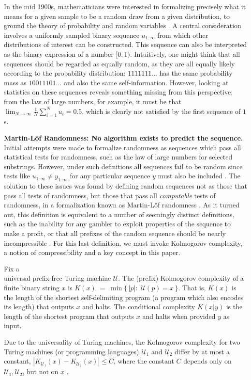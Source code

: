 \documentclass[twoside]{article}
\begin{document}
%
In the mid 1900s, mathematicians were interested in formalizing precisely what it means for a given sample to be a random draw from a given distribution, to ground the theory of probability and random variables \citep{shafer2006sources}. A central consideration involves a uniformly sampled binary sequence $u_{1:\infty}$ from which other distributions of interest can be constructed. This sequence can also be interpreted as the binary expression of a number $[0,1)$. Intuitively, one might think that all sequences should be regarded as equally random, as they are all equally likely according to the probability distribution: $1111111\dots$ has the same probability mass as $10011101\dots$ and also the same self-information. However, looking at statistics on these sequences reveals something missing from this perspective; from the law of large numbers, for example, it must be that $\lim_{N\to \infty}\frac{1}{N}\sum_{i=1}^Nu_i=0.5$, which is clearly not satisfied by the first sequence of $1$s.

\textbf{Martin-L\"of Randomness: No algorithm exists to predict the sequence.}
Initial attempts were made to formalize randomness as sequences which pass all statistical tests for randomness, such as the law of large numbers for selected substrings. However, under such definitions all sequences fail to be random since tests like $u_{1:\infty}\ne y_{1:\infty}$ for any particular sequence $y$ must also be included \citep{downey2019algorithmic}. The solution to these issues was found by defining random sequences not as those that pass all tests of randomness, but those that pass all \emph{computable} tests of randomness, in a formalization known as Martin-L\"of randomness \citep{martin1966definition}. As it turned out, this definition is equivalent to a number of seemingly distinct definitions, such as the inability for any gambler to exploit properties of the sequence to make a profit, or that all prefixes of the random sequence should be nearly incompressible \citep{terwijn2016mathematical}. 
For this last definition, we must invoke Kolmogorov complexity, a notion of compressibility and a key concept in this paper.

\begin{definition}
Fix a \\ universal prefix-free Turing machine $\mathcal{U}$. The (prefix) Kolmogorov complexity of a finite binary string $x$ is $K(x)\;=\;\min\{\,|p|:\; \mathcal{U}(p)=x\,\}$.
That is, $K(x)$ is the length of the shortest self-delimiting program (a program which also encodes its length) that outputs $x$ and halts. The conditional complexity $K(x|y)$ is the length of the shortest program that outputs $x$ and halts when provided $y$ as input.
\end{definition} Due to the universality of Turing machines, the Kolmogorov complexity for two Turing machines (or programming languages) $\mathcal U_1$ and $\mathcal U_2$ differ by at most a constant, $|K_{\mathcal{U}_1}(x)-K_{\mathcal{U}_2}(x)|\le C$, where the constant $C$ depends only on $\mathcal U_1,\mathcal U_2$, but not on $x$ \citep{li2008introduction}. %
\end{document}
